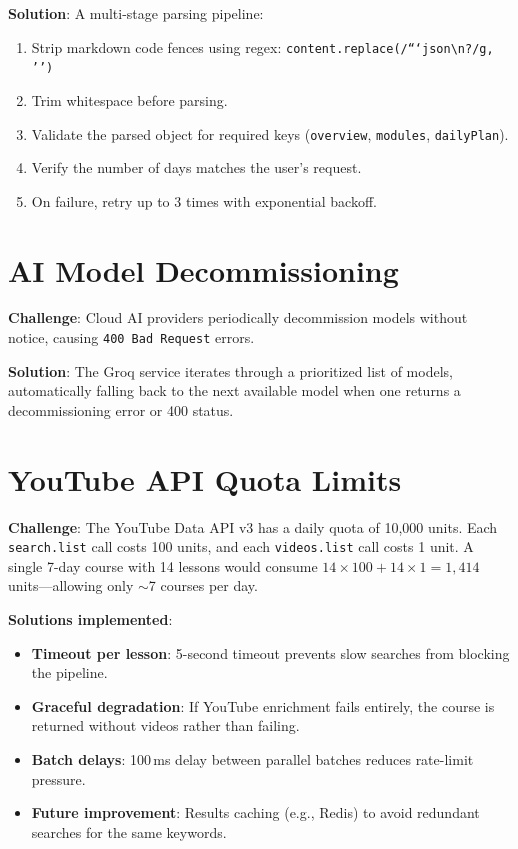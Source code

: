 \documentclass[12pt,a4paper]{report}
\begin{document}
\textbf{Solution}: A multi-stage parsing pipeline:
\begin{enumerate}[noitemsep]
    \item Strip markdown code fences using regex: \texttt{content.replace(/```json\textbackslash n?/g, '')}
    \item Trim whitespace before parsing.
    \item Validate the parsed object for required keys (\texttt{overview}, \texttt{modules}, \texttt{dailyPlan}).
    \item Verify the number of days matches the user's request.
    \item On failure, retry up to 3 times with exponential backoff.
\end{enumerate}

\section{AI Model Decommissioning}
\textbf{Challenge}: Cloud AI providers periodically decommission models without notice, causing \texttt{400 Bad Request} errors.

\textbf{Solution}: The Groq service iterates through a prioritized list of models, automatically falling back to the next available model when one returns a decommissioning error or 400 status.

\section{YouTube API Quota Limits}
\textbf{Challenge}: The YouTube Data API v3 has a daily quota of 10{,}000 units. Each \texttt{search.list} call costs 100 units, and each \texttt{videos.list} call costs 1 unit. A single 7-day course with 14 lessons would consume $14 \times 100 + 14 \times 1 = 1{,}414$ units—allowing only $\sim$7 courses per day.

\textbf{Solutions implemented}:
\begin{itemize}[noitemsep]
    \item \textbf{Timeout per lesson}: 5-second timeout prevents slow searches from blocking the pipeline.
    \item \textbf{Graceful degradation}: If YouTube enrichment fails entirely, the course is returned without videos rather than failing.
    \item \textbf{Batch delays}: 100\,ms delay between parallel batches reduces rate-limit pressure.
    \item \textbf{Future improvement}: Results caching (e.g., Redis) to avoid redundant searches for the same keywords.
\end{itemize}
\end{document}
